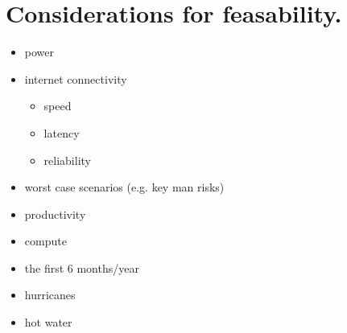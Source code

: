 \section{Considerations for feasability.}
\begin{itemize}
    \item power
    \item internet connectivity
    \begin{itemize}
        \item speed
        \item latency
        \item reliability
    \end{itemize}
    \item worst case scenarios (e.g. key man risks)
    \item productivity
    \item compute
    \item the first 6 months/year
    \item hurricanes
    \item hot water
    
\end{itemize}